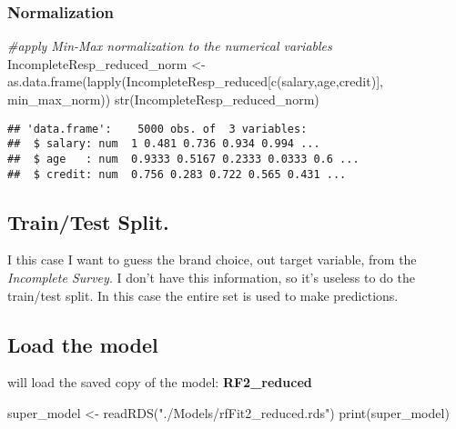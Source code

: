 \documentclass[
]{article}
\newenvironment{Shaded}{\begin{snugshade}}{\end{snugshade}}
\newcommand{\CommentTok}[1]{\textcolor[rgb]{0.56,0.35,0.01}{\textit{#1}}}
\newcommand{\FunctionTok}[1]{\textcolor[rgb]{0.00,0.00,0.00}{#1}}
\newcommand{\NormalTok}[1]{#1}
\newcommand{\OtherTok}[1]{\textcolor[rgb]{0.56,0.35,0.01}{#1}}
\newcommand{\StringTok}[1]{\textcolor[rgb]{0.31,0.60,0.02}{#1}}
\begin{document}
\hypertarget{normalization-1}{%
\subsubsection{Normalization}\label{normalization-1}}

\begin{Shaded}
\begin{Highlighting}[]
\CommentTok{\#apply Min{-}Max normalization to the numerical variables}
\NormalTok{IncompleteResp\_reduced\_norm }\OtherTok{\textless{}{-}} \FunctionTok{as.data.frame}\NormalTok{(}\FunctionTok{lapply}\NormalTok{(IncompleteResp\_reduced[}\FunctionTok{c}\NormalTok{(}\StringTok{\textquotesingle{}salary\textquotesingle{}}\NormalTok{,}\StringTok{\textquotesingle{}age\textquotesingle{}}\NormalTok{,}\StringTok{\textquotesingle{}credit\textquotesingle{}}\NormalTok{)], min\_max\_norm))}
\FunctionTok{str}\NormalTok{(IncompleteResp\_reduced\_norm)}
\end{Highlighting}
\end{Shaded}

\begin{verbatim}
## 'data.frame':    5000 obs. of  3 variables:
##  $ salary: num  1 0.481 0.736 0.934 0.994 ...
##  $ age   : num  0.9333 0.5167 0.2333 0.0333 0.6 ...
##  $ credit: num  0.756 0.283 0.722 0.565 0.431 ...
\end{verbatim}

\hypertarget{traintest-split.}{%
\subsection{Train/Test Split.}\label{traintest-split.}}

I this case I want to guess the brand choice, out target variable, from
the \emph{Incomplete Survey}. I don't have this information, so it's
useless to do the train/test split. In this case the entire set is used
to make predictions.

\hypertarget{load-the-model}{%
\subsection{Load the model}\label{load-the-model}}

will load the saved copy of the model: \textbf{RF2\_reduced}

\begin{Shaded}
\begin{Highlighting}[]
\NormalTok{super\_model }\OtherTok{\textless{}{-}} \FunctionTok{readRDS}\NormalTok{(}\StringTok{"./Models/rfFit2\_reduced.rds"}\NormalTok{)}
\FunctionTok{print}\NormalTok{(super\_model)}
\end{Highlighting}
\end{Shaded}
\end{document}
